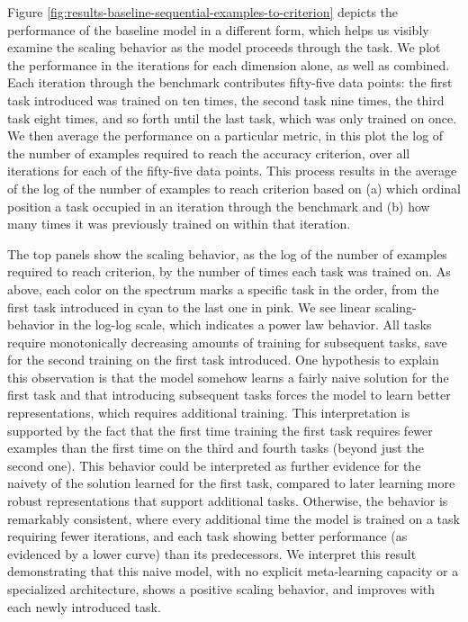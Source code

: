 Figure \ref{fig:results-baseline-sequential-examples-to-criterion} depicts the performance of the baseline model in a different form, which helps us visibly examine the scaling behavior as the model proceeds through the task. We plot the performance in the iterations for each dimension alone, as well as combined. Each iteration through the benchmark contributes fifty-five data points: the first task introduced was trained on ten times, the second task nine times, the third task eight times, and so forth until the last task, which was only trained on once. We then average the performance on a particular metric, in this plot the log of the number of examples required to reach the accuracy criterion, over all iterations for each of the fifty-five data points. This process results in the average of the log of the number of examples to reach criterion based on (a) which ordinal position a task occupied in an iteration through the benchmark and (b) how many times it was previously trained on within that iteration. 

The top panels show the scaling behavior, as the log of the number of examples required to reach criterion, by the number of times each task was trained on. As above, each color on the spectrum marks a specific task in the order, from the first task introduced in cyan to the last one in pink. We see linear scaling-behavior in the log-log scale, which indicates a power law behavior. All tasks require monotonically decreasing amounts of training for subsequent tasks, save for the second training on the first task introduced. One hypothesis to explain this observation is that the model somehow learns a fairly naive solution for the first task and that introducing subsequent tasks forces the model to learn better representations, which requires additional training. This interpretation is supported by the fact that the first time training the first task requires fewer examples than the first time on the third and fourth tasks (beyond just the second one). This behavior could be interpreted as further evidence for the naivety of the solution learned for the first task, compared to later learning more robust representations that support additional tasks. Otherwise, the behavior is remarkably consistent, where every additional time the model is trained on a task requiring fewer iterations, and each task showing better performance (as evidenced by a lower curve) than its predecessors. We interpret this result demonstrating that this naive model, with no explicit meta-learning capacity or a specialized architecture, shows a positive scaling behavior, and improves with each newly introduced task. 

